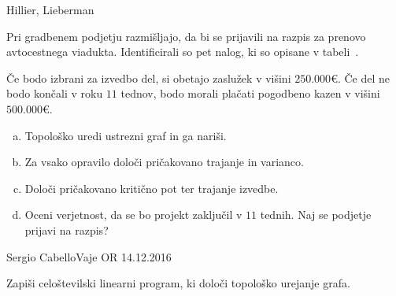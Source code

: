 \begin{naloga}{Hillier, Lieberman}{\cite[Problem~10.4-4]{hl}}
\begin{vprasanje}[viadukt]
Pri gradbenem podjetju razmišljajo,
da bi se prijavili na razpis za prenovo avtocestnega viadukta.
Identificirali so pet nalog, ki so opisane v tabeli~\tab{}.

Če bodo izbrani za izvedbo del, si obetajo zaslužek v višini $250.000 €$.
Če del ne bodo končali v roku $11$ tednov,
bodo morali plačati pogodbeno kazen v višini $500.000 €$.
\begin{enumerate}[(a)]
\item Topološko uredi ustrezni graf in ga nariši.
\item Za vsako opravilo določi pričakovano trajanje in varianco.
\item Določi pričakovano kritično pot ter trajanje izvedbe.
\item Oceni verjetnost, da se bo projekt zaključil v $11$ tednih.
Naj se podjetje prijavi na razpis?
\end{enumerate}

\begin{tabela}
\end{tabela}
\end{vprasanje}
\begin{odgovor}
\end{odgovor}
\end{naloga}


\begin{naloga}{Sergio Cabello}{Vaje OR 14.12.2016}
\begin{vprasanje}
Zapiši celoštevilski linearni program, ki določi topološko urejanje grafa.
\end{vprasanje}
\begin{odgovor}
\end{odgovor}
\end{naloga}


